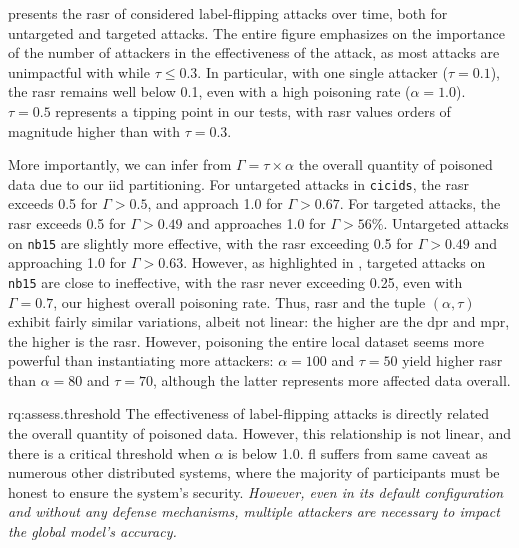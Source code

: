  presents the \gls{rasr} of considered label-flipping attacks over time, both for untargeted and targeted attacks.
The entire figure emphasizes on the importance of the number of attackers in the effectiveness of the attack, as most attacks are unimpactful with while $\tau \leq 0.3$.
In particular, with one single attacker ($\tau=0.1$), the \gls{rasr} remains well below 0.1, even with a high poisoning rate ($\alpha=1.0$).
$\tau=0.5$ represents a tipping point in our tests, with \gls{rasr} values orders of magnitude higher than with $\tau=0.3$.

More importantly, we can infer from $\Gamma=\tau\times\alpha$ the overall quantity of poisoned data due to our \gls{iid} partitioning.
For untargeted attacks in \texttt{cicids}, the \gls{rasr} exceeds 0.5 for $\Gamma>0.5$, and approach 1.0 for $\Gamma>0.67$.
For targeted attacks, the \gls{rasr} exceeds 0.5 for $\Gamma>0.49$ and approaches 1.0 for  $\Gamma>56\%$.
Untargeted attacks on \texttt{nb15} are slightly more effective, with the \gls{rasr} exceeding 0.5 for $\Gamma>0.49$ and approaching 1.0 for $\Gamma>0.63$.
However, as highlighted in , targeted attacks on \texttt{nb15} are close to ineffective, with the \gls{rasr} never exceeding 0.25, even with $\Gamma=0.7$, our highest overall poisoning rate.
Thus, \gls{rasr} and the tuple $(\alpha, \tau)$ exhibit fairly similar variations, albeit not linear: the higher are the \gls{dpr} and \gls{mpr}, the higher is the \gls{rasr}.
However, poisoning the entire local dataset seems more powerful than instantiating more attackers: $\alpha=100$ and $\tau=50$ yield higher \gls{rasr} than $\alpha=80$ and $\tau=70$, although the latter represents more affected data overall.

\begin{answerbox}{rq:assess.threshold}
  The effectiveness of label-flipping attacks is directly related the overall quantity of poisoned data.
  However, this relationship is not linear, and there is a critical threshold when $\alpha$ is below 1.0.
  \Gls{fl} suffers from same caveat as numerous other distributed systems, where the majority of participants must be honest to ensure the system's security.
  \emph{However, even in its default configuration and without any defense mechanisms, multiple attackers are necessary to impact the global model's accuracy.}
\end{answerbox}



